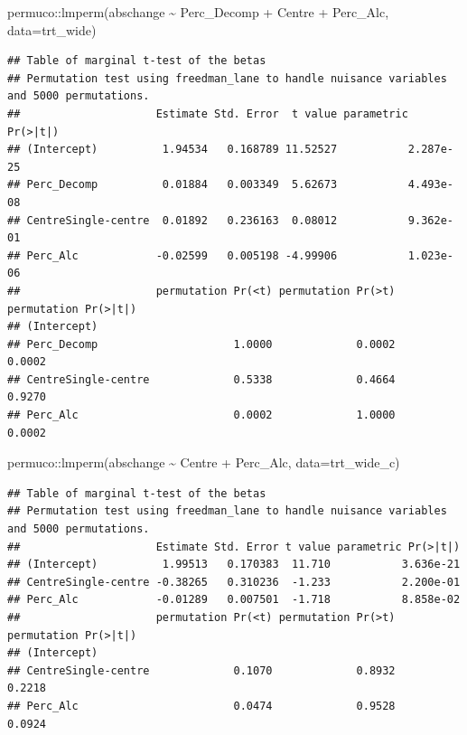 \documentclass[
]{article}
\newenvironment{Shaded}{\begin{snugshade}}{\end{snugshade}}
\newcommand{\AttributeTok}[1]{\textcolor[rgb]{0.77,0.63,0.00}{#1}}
\newcommand{\FunctionTok}[1]{\textcolor[rgb]{0.00,0.00,0.00}{#1}}
\newcommand{\NormalTok}[1]{#1}
\newcommand{\SpecialCharTok}[1]{\textcolor[rgb]{0.00,0.00,0.00}{#1}}
\begin{document}
\begin{Shaded}
\begin{Highlighting}[]
\NormalTok{permuco}\SpecialCharTok{::}\FunctionTok{lmperm}\NormalTok{(abschange }\SpecialCharTok{\textasciitilde{}}\NormalTok{ Perc\_Decomp }\SpecialCharTok{+}\NormalTok{ Centre }\SpecialCharTok{+}\NormalTok{ Perc\_Alc, }\AttributeTok{data=}\NormalTok{trt\_wide)}
\end{Highlighting}
\end{Shaded}

\begin{verbatim}
## Table of marginal t-test of the betas
## Permutation test using freedman_lane to handle nuisance variables and 5000 permutations.
##                     Estimate Std. Error  t value parametric Pr(>|t|)
## (Intercept)          1.94534   0.168789 11.52527           2.287e-25
## Perc_Decomp          0.01884   0.003349  5.62673           4.493e-08
## CentreSingle-centre  0.01892   0.236163  0.08012           9.362e-01
## Perc_Alc            -0.02599   0.005198 -4.99906           1.023e-06
##                     permutation Pr(<t) permutation Pr(>t) permutation Pr(>|t|)
## (Intercept)                                                                   
## Perc_Decomp                     1.0000             0.0002               0.0002
## CentreSingle-centre             0.5338             0.4664               0.9270
## Perc_Alc                        0.0002             1.0000               0.0002
\end{verbatim}

\begin{Shaded}
\begin{Highlighting}[]
\NormalTok{permuco}\SpecialCharTok{::}\FunctionTok{lmperm}\NormalTok{(abschange }\SpecialCharTok{\textasciitilde{}}\NormalTok{ Centre }\SpecialCharTok{+}\NormalTok{ Perc\_Alc, }\AttributeTok{data=}\NormalTok{trt\_wide\_c)}
\end{Highlighting}
\end{Shaded}

\begin{verbatim}
## Table of marginal t-test of the betas
## Permutation test using freedman_lane to handle nuisance variables and 5000 permutations.
##                     Estimate Std. Error t value parametric Pr(>|t|)
## (Intercept)          1.99513   0.170383  11.710           3.636e-21
## CentreSingle-centre -0.38265   0.310236  -1.233           2.200e-01
## Perc_Alc            -0.01289   0.007501  -1.718           8.858e-02
##                     permutation Pr(<t) permutation Pr(>t) permutation Pr(>|t|)
## (Intercept)                                                                   
## CentreSingle-centre             0.1070             0.8932               0.2218
## Perc_Alc                        0.0474             0.9528               0.0924
\end{verbatim}
\end{document}
